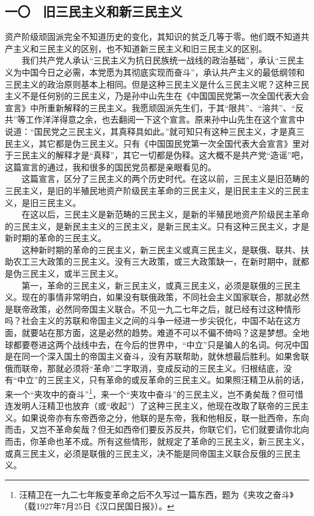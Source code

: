 \documentclass[cn,11pt,chinese]{elegantbook}
\def\myformat#1{\hfil\hfil #1}
\begin{document}
\subsection*{\myformat{一〇　旧三民主义和新三民主义}}
资产阶级顽固派完全不知道历史的变化，其知识的贫乏几等于零。他们既不知道共产主义和三民主义的区别，也不知道新三民主义和旧三民主义的区别。\\
　　我们共产党人承认“三民主义为抗日民族统一战线的政治基础”，承认“三民主义为中国今日之必需，本党愿为其彻底实现而奋斗”，承认共产主义的最低纲领和三民主义的政治原则基本上相同。但是这种三民主义是什么三民主义呢？这种三民主义不是任何别的三民主义，乃是孙中山先生在《中国国民党第一次全国代表大会宣言》中所重新解释的三民主义。我愿顽固派先生们，于其“限共”、“溶共”、“反共”等工作洋洋得意之余，也去翻阅一下这个宣言。原来孙中山先生在这个宣言中说道：“国民党之三民主义，其真释具如此。”就可知只有这种三民主义，才是真三民主义，其它都是伪三民主义。只有《中国国民党第一次全国代表大会宣言》里对于三民主义的解释才是“真释”，其它一切都是伪释。这大概不是共产党“造谣”吧，这篇宣言的通过，我和很多的国民党员都是亲眼看见的。\\
　　这篇宣言，区分了三民主义的两个历史时代。在这以前，三民主义是旧范畴的三民主义，是旧的半殖民地资产阶级民主革命的三民主义，是旧民主主义的三民主义，是旧三民主义。\\
　　在这以后，三民主义是新范畴的三民主义，是新的半殖民地资产阶级民主革命的三民主义，是新民主主义的三民主义，是新三民主义。只有这种三民主义，才是新时期的革命的三民主义。\\
　　这种新时期的革命的三民主义，新三民主义或真三民主义，是联俄、联共、扶助农工三大政策的三民主义。没有三大政策，或三大政策缺一，在新时期中，就都是伪三民主义，或半三民主义。\\
　　第一，革命的三民主义，新三民主义，或真三民主义，必须是联俄的三民主义。现在的事情非常明白，如果没有联俄政策，不同社会主义国家联合，那就必然是联帝政策，必然同帝国主义联合。不见一九二七年之后，就已经有过这种情形吗？社会主义的苏联和帝国主义之间的斗争一经进一步尖锐化，中国不站在这方面，就要站在那方面，这是必然的趋势。难道不可以不偏不倚吗？这是梦想。全地球都要卷进这两个战线中去，在今后的世界中，“中立”只是骗人的名词。何况中国是在同一个深入国土的帝国主义奋斗，没有苏联帮助，就休想最后胜利。如果舍联俄而联帝，那就必须将“革命”二字取消，变成反动的三民主义。归根结底，没有“中立”的三民主义，只有革命的或反革命的三民主义。如果照汪精卫从前的话，来一个“夹攻中的奋斗”\footnote[24]{ 汪精卫在一九二七年叛变革命之后不久写过一篇东西，题为《夹攻之奋斗》（载1927年7月25日《汉口民国日报》）。}，来一个“夹攻中奋斗”的三民主义，岂不勇矣哉？但可惜连发明人汪精卫也放弃（或“收起”）了这种三民主义，他现在改取了联帝的三民主义。如果说帝亦有东帝西帝之分，他联的是东帝，我和他相反，联一批西帝，东向而击，又岂不革命矣哉？但无如西帝们要反苏反共，你联它们，它们就要请你北向而击，你革命也革不成。所有这些情形，就规定了革命的三民主义，新三民主义，或真三民主义，必须是联俄的三民主义，决不能是同帝国主义联合反俄的三民主义。\\
\end{document}
